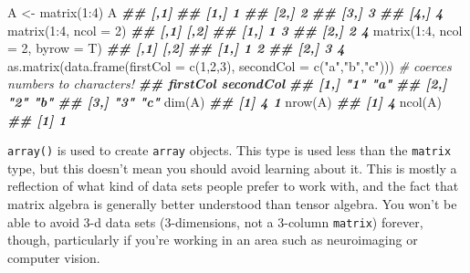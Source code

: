 \documentclass[
  12pt,
]{krantz}
\makeatletter
\newenvironment{Shaded}{\begin{snugshade}}{\end{snugshade}}
\newcommand{\AttributeTok}[1]{\textcolor[rgb]{0.61,0.61,0.61}{#1}}
\newcommand{\CommentTok}[1]{\textcolor[rgb]{0.37,0.37,0.37}{\textit{#1}}}
\newcommand{\DecValTok}[1]{\textcolor[rgb]{0.06,0.06,0.06}{#1}}
\newcommand{\DocumentationTok}[1]{\textcolor[rgb]{0.37,0.37,0.37}{\textbf{\textit{#1}}}}
\newcommand{\FunctionTok}[1]{\textcolor[rgb]{0,0,0}{#1}}
\newcommand{\NormalTok}[1]{#1}
\newcommand{\OtherTok}[1]{\textcolor[rgb]{0.37,0.37,0.37}{#1}}
\newcommand{\SpecialCharTok}[1]{\textcolor[rgb]{0,0,0}{#1}}
\newcommand{\StringTok}[1]{\textcolor[rgb]{0.5,0.5,0.5}{#1}}
\newenvironment{kframe}{%
\medskip{}
\setlength{\fboxsep}{.8em}
 \def\at@end@of@kframe{}%
 \ifinner\ifhmode%
  \def\at@end@of@kframe{\end{minipage}}%
  \begin{minipage}{\columnwidth}%
 \fi\fi%
 \def\FrameCommand##1{\hskip\@totalleftmargin \hskip-\fboxsep
 \colorbox{shadecolor}{##1}\hskip-\fboxsep
     \hskip-\linewidth \hskip-\@totalleftmargin \hskip\columnwidth}%
 \MakeFramed {\advance\hsize-\width
   \@totalleftmargin\z@ \linewidth\hsize
   \@setminipage}}%
 {\par\unskip\endMakeFramed%
 \at@end@of@kframe}
\renewenvironment{Shaded}{\begin{kframe}}{\end{kframe}}
\makeatother
\begin{document}
\begin{Shaded}
\begin{Highlighting}[]
\NormalTok{A }\OtherTok{\textless{}{-}} \FunctionTok{matrix}\NormalTok{(}\DecValTok{1}\SpecialCharTok{:}\DecValTok{4}\NormalTok{)}
\NormalTok{A}
\DocumentationTok{\#\#      [,1]}
\DocumentationTok{\#\# [1,]    1}
\DocumentationTok{\#\# [2,]    2}
\DocumentationTok{\#\# [3,]    3}
\DocumentationTok{\#\# [4,]    4}
\FunctionTok{matrix}\NormalTok{(}\DecValTok{1}\SpecialCharTok{:}\DecValTok{4}\NormalTok{, }\AttributeTok{ncol =} \DecValTok{2}\NormalTok{)}
\DocumentationTok{\#\#      [,1] [,2]}
\DocumentationTok{\#\# [1,]    1    3}
\DocumentationTok{\#\# [2,]    2    4}
\FunctionTok{matrix}\NormalTok{(}\DecValTok{1}\SpecialCharTok{:}\DecValTok{4}\NormalTok{, }\AttributeTok{ncol =} \DecValTok{2}\NormalTok{, }\AttributeTok{byrow =}\NormalTok{ T)}
\DocumentationTok{\#\#      [,1] [,2]}
\DocumentationTok{\#\# [1,]    1    2}
\DocumentationTok{\#\# [2,]    3    4}
\FunctionTok{as.matrix}\NormalTok{(}\FunctionTok{data.frame}\NormalTok{(}\AttributeTok{firstCol =} \FunctionTok{c}\NormalTok{(}\DecValTok{1}\NormalTok{,}\DecValTok{2}\NormalTok{,}\DecValTok{3}\NormalTok{), }\AttributeTok{secondCol =} \FunctionTok{c}\NormalTok{(}\StringTok{"a"}\NormalTok{,}\StringTok{"b"}\NormalTok{,}\StringTok{"c"}\NormalTok{))) }\CommentTok{\# coerces numbers to characters!}
\DocumentationTok{\#\#      firstCol secondCol}
\DocumentationTok{\#\# [1,] "1"      "a"      }
\DocumentationTok{\#\# [2,] "2"      "b"      }
\DocumentationTok{\#\# [3,] "3"      "c"}
\FunctionTok{dim}\NormalTok{(A)}
\DocumentationTok{\#\# [1] 4 1}
\FunctionTok{nrow}\NormalTok{(A)}
\DocumentationTok{\#\# [1] 4}
\FunctionTok{ncol}\NormalTok{(A)}
\DocumentationTok{\#\# [1] 1}
\end{Highlighting}
\end{Shaded}

\texttt{array()} is used to create \texttt{array} objects. This type is used less than the \texttt{matrix} type, but this doesn't mean you should avoid learning about it. This is mostly a reflection of what kind of data sets people prefer to work with, and the fact that matrix algebra is generally better understood than tensor algebra. You won't be able to avoid 3-d data sets (3-dimensions, not a 3-column \texttt{matrix}) forever, though, particularly if you're working in an area such as neuroimaging or computer vision.
\end{document}
